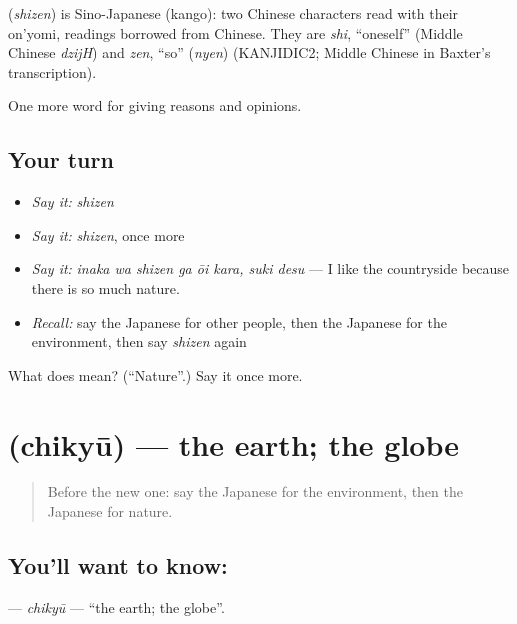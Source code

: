 \begin{cousinweb}
\textbf{} (\emph{shizen}) is Sino-Japanese (kango): two Chinese characters read with their on'yomi, readings borrowed from Chinese. They are \emph{shi}, \textquotedblleft{}oneself\textquotedblright{} (Middle Chinese \emph{dzijH}) and \emph{zen}, \textquotedblleft{}so\textquotedblright{} (\emph{nyen}) (KANJIDIC2; Middle Chinese in Baxter's transcription).
\end{cousinweb}

\begin{grammarlens}[title={What you've built}]
One more word for giving reasons and opinions.
\end{grammarlens}

\subsection*{Your turn}
\begin{itemize}
\raggedright
  \item \emph{Say it:} \emph{shizen}
  \item \emph{Say it:} \emph{shizen}, once more
  \item \emph{Say it:} \emph{inaka wa shizen ga ōi kara, suki desu} — I like the countryside because there is so much nature.
  \item \emph{Recall:} say the Japanese for other people, then the Japanese for the environment, then say \emph{shizen} again
\end{itemize}

\begin{tcolorbox}[breakable,colback=teal!4,colframe=teal!35!black,title={Before you move on}]
What does  mean? (\textquotedblleft{}Nature\textquotedblright{}.) Say it once more.
\end{tcolorbox}
\section[\texorpdfstring{\ja{ちきゅう} (chikyū)}{ちきゅう (chikyū)}]{ (chikyū) — the earth; the globe}

\label{lesson:JA-C336-chikyuu}



\begin{quote}
Before the new one: say the Japanese for the environment, then the Japanese for nature.
\end{quote}

\subsection*{You'll want to know: }
\textbf{} — \emph{chikyū} — \textquotedblleft{}the earth; the globe\textquotedblright{}.

